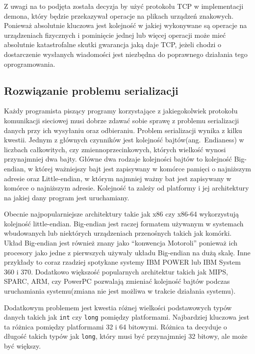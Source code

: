 \documentclass[11pt]{scrartcl}
\begin{document}
Z uwagi na to podjęta została decyzja by użyć protokołu TCP w implementacji demona, który będzie przekazywał operacje na plikach urządzeń znakowych. Ponieważ absolutnie kluczowa jest kolejność w jakiej wykonywane są operacje na urządzeniach fizycznych i pominięcie jednej lub więcej operacji może mieć absolutnie katastrofalne skutki gwarancja jaką daje TCP, jeżeli chodzi o dostarczenie wysłanych wiadomości jest niezbędna do poprawnego działania tego oprogramowania.

\subsection{Rozwiązanie problemu serializacji}

Każdy programista piszący programy korzystające z jakiegokolwiek protokołu komunikacji sieciowej musi dobrze zdawać sobie sprawę z problemu serializacji danych przy ich wysyłaniu oraz odbieraniu. Problem serializacji wynika z kilku kwestii. Jednym z głównych czynników jest kolejność bajtów(ang.\ Endianess) w liczbach całkowitych, czy zmiennoprzecinkowych, których wielkość wynosi przynajmniej dwa bajty. Główne dwa rodzaje kolejności bajtów to kolejność Big-endian, w której ważniejszy bajt jest zapisywany w komórce pamięci o najniższym adresie oraz Little-endian, w którym najmniej ważny bat jest zapisywany w komórce o najniższym adresie. Kolejność ta zależy od platformy i jej architektury na jakiej dany program jest uruchamiany.

Obecnie najpopularniejsze architektury takie jak x86 czy x86-64 wykorzystują kolejność little-endian. Big-endian jest raczej formatem używanym w systemach wbudowanych lub niektórych urządzeniach przenośnych takich jak komórki. Układ Big-endian jest również znany jako ``konwencja Motoroli'' ponieważ ich procesory jako jedne z pierwszych używały układu Big-endian na dużą skalę. Inne przykłady to coraz rzadziej spotykane systemy IBM POWER lub IBM System 360 i 370. Dodatkowo większość popularnych architektur takich jak MIPS, SPARC, ARM, czy PowerPC pozwalają zmieniać kolejność bajtów podczas uruchamiania systemu(zmiana nie jest możliwa w trakcie działania systemu).

Dodatkowym problemem jest kwestia różnej wielkości podstawowych typów danych takich jak \texttt{int} czy \texttt{long} pomiędzy platformami. Najbardziej kluczowa jest ta różnica pomiędzy platformami 32 i 64 bitowymi. Różnica ta decyduje o długość takich typów jak \texttt{long}, który musi być przynajmniej 32 bitowy, ale może być większy.
\end{document}
